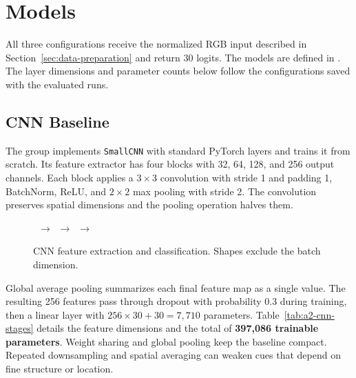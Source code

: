 \section{Models}
\label{sec:models}

All three configurations receive the normalized RGB input described in Section~\ref{sec:data-preparation} and return 30 logits. The models are defined in . The layer dimensions and parameter counts below follow the configurations saved with the evaluated runs.

\subsection{CNN Baseline}
\label{sec:a2-cnn}

The group implements \texttt{SmallCNN} with standard PyTorch layers and trains it from scratch. Its feature extractor has four blocks with 32, 64, 128, and 256 output channels. Each block applies a $3\times3$ convolution with stride 1 and padding 1, BatchNorm, ReLU, and $2\times2$ max pooling with stride 2. The convolution preserves spatial dimensions and the pooling operation halves them.

\begin{figure}[H]
    \centering
    \small
    \mbox{%
        \enspace$\rightarrow$\enspace
        \enspace$\rightarrow$\enspace
        \enspace$\rightarrow$\enspace
    }
    \caption{CNN feature extraction and classification. Shapes exclude the batch dimension.}
    \label{fig:a2-cnn}
\end{figure}

Global average pooling summarizes each final feature map as a single value. The resulting 256 features pass through dropout with probability 0.3 during training, then a linear layer with $256\times30+30=7{,}710$ parameters. Table~\ref{tab:a2-cnn-stages} details the feature dimensions and the total of \textbf{397,086 trainable parameters}. Weight sharing and global pooling keep the baseline compact. Repeated downsampling and spatial averaging can weaken cues that depend on fine structure or location.

